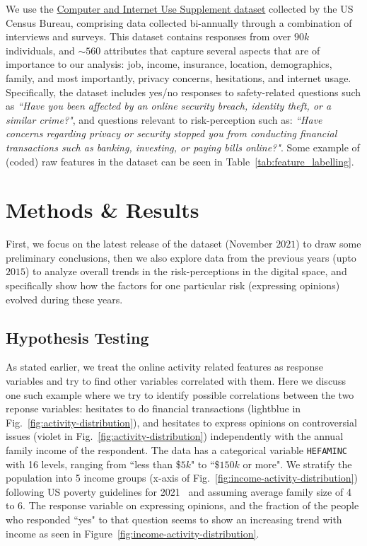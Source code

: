 \documentclass{article}
\theoremstyle{plain}
\theoremstyle{definition}
\theoremstyle{remark}
\newcommand{\pradyumna}[1]{{\color{red}\bf [PM: #1]}}
\begin{document}
We use the \href{https://www.census.gov/data/datasets/time-series/demo/cps/cps-supp_cps-repwgt/cps-computer.html}{Computer and Internet Use Supplement dataset} collected by the US Census Bureau, comprising data collected bi-annually
through a combination of interviews and surveys. This dataset contains responses from over $90k$ individuals, and $\sim560$ attributes that capture several aspects that are of importance to our analysis: job, income, insurance, location, demographics, family, and most importantly, privacy concerns, hesitations, and internet usage. Specifically, the dataset includes yes/no responses to safety-related questions such as \emph{``Have you been affected by an online security breach, identity theft, or a similar crime?"}, and questions relevant to risk-perception such as: \emph{``Have concerns regarding privacy or security stopped you from conducting financial transactions such as banking, investing, or paying bills online?"}. Some example of (coded) raw features in the dataset can be seen in Table~\ref{tab:feature_labelling}.

\section{Methods \& Results}

First, we focus on the latest release of the dataset (November $2021$) to draw some preliminary conclusions, then we also explore data from the previous years (upto $2015$) to analyze overall trends in the risk-perceptions in the digital space, and specifically show how the factors for one particular risk (expressing opinions) evolved during these years.


\subsection{Hypothesis Testing}
\label{sec: hyp-test}
As stated earlier, we treat the online activity related features as response variables and try to find other variables correlated with them. Here we discuss one such example where we try to identify possible correlations between the two reponse variables: hesitates to do financial transactions (lightblue in Fig.~\ref{fig:activity-distribution}), and hesitates to express opinions on controversial issues (violet in Fig.~\ref{fig:activity-distribution}) independently with the annual family income of the respondent. The data has a categorical variable \texttt{HEFAMINC} with 16 levels, ranging from ``less than \$$5k$" to ``\$$150k$ or more". We stratify the population into 5 income groups (x-axis of Fig.~\ref{fig:income-activity-distribution}) following US poverty guidelines for 2021~\cite{poverty_thresholds, poverty_thresholds_yahoo} and assuming average family size of 4 to 6. The response variable on expressing opinions, and the fraction of the people who responded ``yes" to that question seems to show an increasing trend with income as seen in Figure~\ref{fig:income-activity-distribution}.
\end{document}
